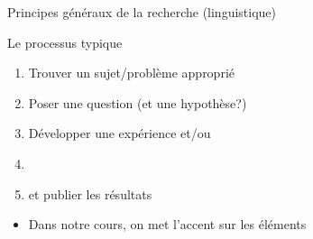 \documentclass[xcolor=dvipsnames, mathserif, 10pt, aspectratio=169, handout]{beamer}
\begin{document}


\begin{transitionframe}


Principes généraux de la recherche (linguistique)


\end{transitionframe}




\begin{frame}{Le processus typique}

\begin{enumerate}
	\item Trouver un sujet/problème approprié
\pause
	\item Poser une question (et une hypothèse?)
\pause
	\item Développer une expérience et/ou 
\pause
	\item {}
\pause
	\item {} et publier les résultats
\end{enumerate}

\vspace{3ex}

\begin{itemize}
	\item[\winner] Dans notre cours, on met l'accent sur les éléments 
\end{itemize}
	
\end{frame}

\end{document}
